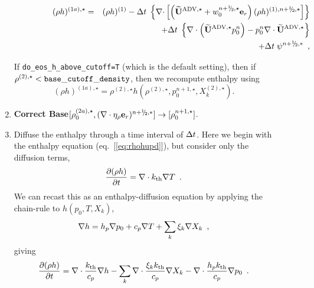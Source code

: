 \begin{description}
\begin{enumerate}
\begin{enumerate}
\begin{description}
  \begin{eqnarray}
  (\rho h)^{(1a),\star} &=& (\rho h)^{(1)} - \dt \; \left\{ \nablab
      \cdotb \left[ \left(\uadvone+w_0^{\nph,\star} \er\right) (\rho
      h)^{(1),\nph,\star} \right] \right\} \nonumber \\ 
    && + \dt \; \left \{ \nabla \cdot \left (\uadvone p_0^{n} \right ) 
       - p_0^{n} \nabla \cdot \uadvone \right \} \nonumber \\
    && + \dt \; \psi^{\nph,*} \enskip ,
  \end{eqnarray}

\end{description}

\end{enumerate}

If {\tt do\_eos\_h\_above\_cutoff=T} (which is the default setting), then if
$\rho^{(2),\star} < {\tt base\_cutoff\_density}$, then we recompute enthalpy using
\begin{equation}
(\rho h)^{(1a),\star} = \rho^{(2),\star}h\left(\rho^{(2),\star},p_0^{n+1,\star},X_k^{(2),\star}\right).
\end{equation}

\item {\bf Correct Base}$[\rho_0^{(2a),\star}, (\nabla\cdot\etarho\er)^{\nph,*}] \rightarrow [\rho_0^{n+1,\star}]$.



\item Diffuse the enthalpy through a time interval of $\Delta t$.  Here we begin
with the enthalpy equation (eq.~[\ref{eq:rhohupd}]), but consider only the 
diffusion terms,
\begin{equation}
  \frac{\partial (\rho h)}{\partial t}  = 
 \nabla\cdot k_{\rm th}\nabla T 
\enskip . \label{eq:rhohupdthermal} 
  \end{equation}
We can recast this as an enthalpy-diffusion equation by applying the
chain-rule to $h(p_0,T,X_k)$,
\begin{equation}
\nabla h = h_p \nabla p_0 + c_p \nabla T + \sum_k \xi_k \nabla X_k \enskip ,
\end{equation}
giving
\begin{equation}
  \frac{\partial (\rho h)}{\partial t}  = 
 \nabla\cdot \frac{k_{\rm th}}{c_p}\nabla h -  
 \sum_k \nabla\cdot \frac{\xi_k k_{\rm th}}{c_p}\nabla X_k -
 \nabla\cdot \frac{h_p k_{\rm th}}{c_p}\nabla p_0 
\enskip . \label{eq:rhohupdthermal2} 
  \end{equation}



\end{enumerate}
\end{description}
